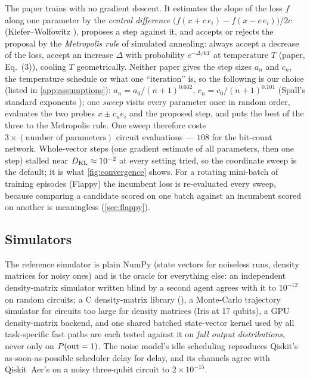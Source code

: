 The paper trains with no gradient descent.  It estimates the slope of the loss $f$ along one
parameter by the \emph{central difference} $\bigl(f(x+c\,e_i) - f(x-c\,e_i)\bigr)/2c$
(Kiefer--Wolfowitz \cite{kw}), proposes a step against it, and accepts or rejects the proposal by
the \emph{Metropolis rule} of simulated annealing: always accept a decrease of the loss, accept
an increase $\Delta$ with probability $e^{-\Delta/kT}$ at temperature $T$ (paper, Eq.~(3)),
cooling $T$ geometrically.  Neither paper gives the step sizes $a_n$ and $c_n$, the
temperature schedule or what one ``iteration'' is, so the following is our choice (listed in
\cref{app:assumptions}): $a_n = a_0/(n+1)^{0.602}$, $c_n = c_0/(n+1)^{0.101}$ (Spall's standard
exponents \cite{spall}); one \emph{sweep} visits every parameter once in random order, evaluates
the two probes $x\pm c_n e_i$ and the proposed step, and puts the best of the three to the
Metropolis rule.  One sweep therefore costs $3\times(\text{number of parameters})$ circuit
evaluations --- $108$ for the bit-count network.  Whole-vector steps (one gradient estimate of all
parameters, then one step) stalled near $D_{\mathrm{KL}}\approx 10^{-2}$ at every setting tried, so the
coordinate sweep is the default; it is what \cref{fig:convergence} shows.  For a rotating
mini-batch of training episodes (Flappy) the incumbent loss is re-evaluated every sweep, because
comparing a candidate scored on one batch against an incumbent scored on another is meaningless
(\cref{sec:flappy}).

\subsection{Simulators}
\label{sec:simulators}

The reference simulator is plain NumPy (state vectors for noiseless runs, density matrices for
noisy ones) and is the oracle for everything else: an independent density-matrix simulator
written blind by a second agent agrees with it to $10^{-12}$ on random circuits; a C density-matrix
library (), a Monte-Carlo trajectory simulator for circuits too large for density
matrices (Iris at 17 qubits), a GPU density-matrix backend, and one shared batched state-vector
kernel used by all task-specific fast paths are each tested against it on \emph{full output
distributions}, never only on $P(\mathrm{out}=1)$.  The noise model's idle scheduling reproduces Qiskit's
as-soon-as-possible scheduler delay for delay, and its channels agree with Qiskit~Aer's on a
noisy three-qubit circuit to $2\times 10^{-15}$.
